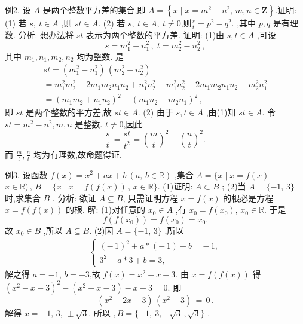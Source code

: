 例2. 设 $A$ 是两个整数平方差的集合,即 $A=\left\{x\mid x=m^{2}-n^{2},\,m,n\in\mathbf{Z}\right\}$.证明:
(1) 若 $s,\ t\in A$ ,则 $s t\in A.$ 
(2) 若 $s,\ t\in A,\ t\neq0$,则$\frac{s}{t}=p^{2}-q^{2}.$ ,其中 $p,q$ 是有理数.
分析: 想办法将 $st$ 表示为两个整数的平方差.
证明: (1)由 $s,t\in A$ ,可设
$$
s=m_{1}^{2}-n_{1}^{2}\,,\;t=m_{2}^{2}-n_{2}^{2}\,, 
$$
其中 $m_{1}, n_{1}, m_{2}, n_{2}$ 均为整数.
是
$$
\begin{array}{l}{{s t=(m_{1}^{2}-n_{1}^{2})\,(m_{2}^{2}-n_{2}^{2})}}\\ {{=m_{1}^{2}m_{2}^{2}+2m_{1}m_{2}n_{1}n_{2}+n_{1}^{2}n_{2}^{2}-m_{1}^{2}n_{2}^{2}-2m_{1}m_{2}n_{1}n_{2}-m_{2}^{2}n_{1}^{2}}}\\ {{=(m_{1}m_{2}+n_{1}n_{2})^{2}-(m_{1}n_{2}+m_{2}n_{1})^{2}\,,}}\end{array} 
$$
即 $st$ 是两个整数的平方差,故 $s t\in A.$ 
(2) 由于 $s, t \in A$ ,由(1)知 $s t\in A.$ 令 $s t=m^{2}-n^{2},m,n$ 是整数.
 $t\neq 0$,因此
$$
{\frac{s}{t}}\,={\frac{s t}{t^{2}}}=\left({\frac{m}{t}}\right)^{2}-\left({\frac{n}{t}}\right)^{2}. 
$$
而 ${\frac{m}{t}},{\frac{n}{t}}$ 均为有理数,故命题得证.



例3. 设函数 $f(x)=x^{2}+a x+b\ (a,\,b\in\mathbb{R})$ ,集合 $A=\{x\mid x=f(x)$  $x\in\mathbb{R})\,,\,B=\{x\mid x=f(f(x))\,,\,x\in\mathbb{R}\}.$ 
(1)证明: $A\subset B$ ;
(2)当 $A=\{-1,\,3\}$ 时,求集合 $B$ .
分析: 欲证 $A\subseteq B$, 只需证明方程 $x=f(x)$ 的根必是方程 $x=f(f(x))$ 的根.
解: (1)对任意的 $x_{0}\in A$ ,有 $x_{0}=f(x_{0}), \, x_0 \in \mathbb{R}.$
于是
$$
f(f(x_{0}))=f(x_{0})=x_{0}. 
$$
故 $x_{0}\in B$ ,所以 $A\subseteq B$. 
(2)因 $A=\{-1,\,3\}$ ,所以
$$
\begin{align*}
\left\{
\begin{aligned}
    (-\,1)^{2}+a*(-\,1)+b=-\,1, \\
    3^{2}+a*3+b=3,
\end{aligned}
\right.
\end{align*}
$$
解之得 $a=-1$, $b=-3$,故 $f(x)=x^{2}-x-3.$ 由 $x=f(f(x))$ 得
$(x^2-x-3)^2-(x^2-x-3)-x-3= 0.$
即
$$
(x^{2}-2x-3)\,(x^{2}-3)\,=\,0\,. 
$$
解得 $x=-1,\,3,\,\pm{\sqrt{3}}.$ 
所以 $,B=\{-1,\ 3,-{\sqrt{3}}\,,{\sqrt{3}}\}$ .



